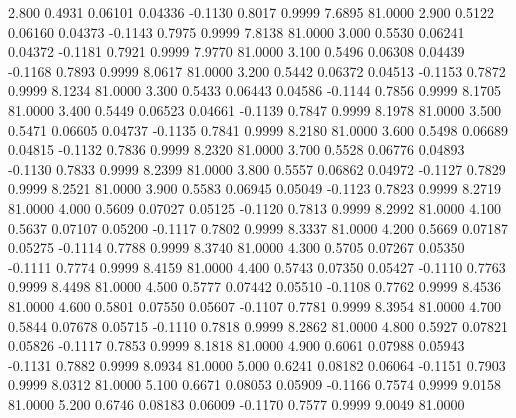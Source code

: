    2.800   0.4931   0.06101   0.04336  -0.1130   0.8017   0.9999   7.6895  81.0000
   2.900   0.5122   0.06160   0.04373  -0.1143   0.7975   0.9999   7.8138  81.0000
   3.000   0.5530   0.06241   0.04372  -0.1181   0.7921   0.9999   7.9770  81.0000
   3.100   0.5496   0.06308   0.04439  -0.1168   0.7893   0.9999   8.0617  81.0000
   3.200   0.5442   0.06372   0.04513  -0.1153   0.7872   0.9999   8.1234  81.0000
   3.300   0.5433   0.06443   0.04586  -0.1144   0.7856   0.9999   8.1705  81.0000
   3.400   0.5449   0.06523   0.04661  -0.1139   0.7847   0.9999   8.1978  81.0000
   3.500   0.5471   0.06605   0.04737  -0.1135   0.7841   0.9999   8.2180  81.0000
   3.600   0.5498   0.06689   0.04815  -0.1132   0.7836   0.9999   8.2320  81.0000
   3.700   0.5528   0.06776   0.04893  -0.1130   0.7833   0.9999   8.2399  81.0000
   3.800   0.5557   0.06862   0.04972  -0.1127   0.7829   0.9999   8.2521  81.0000
   3.900   0.5583   0.06945   0.05049  -0.1123   0.7823   0.9999   8.2719  81.0000
   4.000   0.5609   0.07027   0.05125  -0.1120   0.7813   0.9999   8.2992  81.0000
   4.100   0.5637   0.07107   0.05200  -0.1117   0.7802   0.9999   8.3337  81.0000
   4.200   0.5669   0.07187   0.05275  -0.1114   0.7788   0.9999   8.3740  81.0000
   4.300   0.5705   0.07267   0.05350  -0.1111   0.7774   0.9999   8.4159  81.0000
   4.400   0.5743   0.07350   0.05427  -0.1110   0.7763   0.9999   8.4498  81.0000
   4.500   0.5777   0.07442   0.05510  -0.1108   0.7762   0.9999   8.4536  81.0000
   4.600   0.5801   0.07550   0.05607  -0.1107   0.7781   0.9999   8.3954  81.0000
   4.700   0.5844   0.07678   0.05715  -0.1110   0.7818   0.9999   8.2862  81.0000
   4.800   0.5927   0.07821   0.05826  -0.1117   0.7853   0.9999   8.1818  81.0000
   4.900   0.6061   0.07988   0.05943  -0.1131   0.7882   0.9999   8.0934  81.0000
   5.000   0.6241   0.08182   0.06064  -0.1151   0.7903   0.9999   8.0312  81.0000
   5.100   0.6671   0.08053   0.05909  -0.1166   0.7574   0.9999   9.0158  81.0000
   5.200   0.6746   0.08183   0.06009  -0.1170   0.7577   0.9999   9.0049  81.0000
